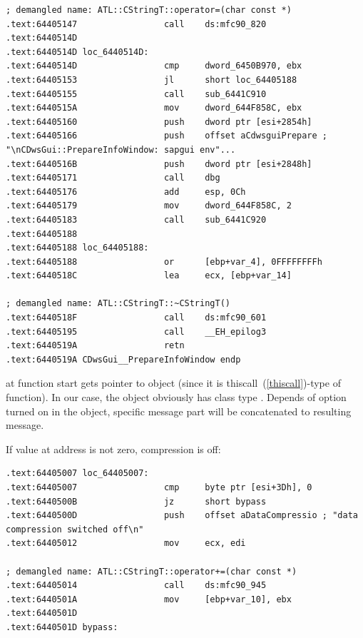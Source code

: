 \begin{lstlisting}
; demangled name: ATL::CStringT::operator=(char const *)
.text:64405147                 call    ds:mfc90_820
.text:6440514D
.text:6440514D loc_6440514D:
.text:6440514D                 cmp     dword_6450B970, ebx
.text:64405153                 jl      short loc_64405188
.text:64405155                 call    sub_6441C910
.text:6440515A                 mov     dword_644F858C, ebx
.text:64405160                 push    dword ptr [esi+2854h]
.text:64405166                 push    offset aCdwsguiPrepare ; "\nCDwsGui::PrepareInfoWindow: sapgui env"...
.text:6440516B                 push    dword ptr [esi+2848h]
.text:64405171                 call    dbg
.text:64405176                 add     esp, 0Ch
.text:64405179                 mov     dword_644F858C, 2
.text:64405183                 call    sub_6441C920
.text:64405188
.text:64405188 loc_64405188:
.text:64405188                 or      [ebp+var_4], 0FFFFFFFFh
.text:6440518C                 lea     ecx, [ebp+var_14]

; demangled name: ATL::CStringT::~CStringT()
.text:6440518F                 call    ds:mfc90_601
.text:64405195                 call    __EH_epilog3
.text:6440519A                 retn
.text:6440519A CDwsGui__PrepareInfoWindow endp
\end{lstlisting}

{\ECX at function start gets pointer to object (since it is thiscall~(\ref{thiscall})-type of function).
In our case, the object obviously has class type . 
Depends of option turned on in the object, specific message part will be concatenated to resulting message.}

{If value at  address is not zero, compression is off}:

\begin{lstlisting}
.text:64405007 loc_64405007:
.text:64405007                 cmp     byte ptr [esi+3Dh], 0
.text:6440500B                 jz      short bypass
.text:6440500D                 push    offset aDataCompressio ; "data compression switched off\n"
.text:64405012                 mov     ecx, edi

; demangled name: ATL::CStringT::operator+=(char const *)
.text:64405014                 call    ds:mfc90_945
.text:6440501A                 mov     [ebp+var_10], ebx
.text:6440501D
.text:6440501D bypass:
\end{lstlisting}

